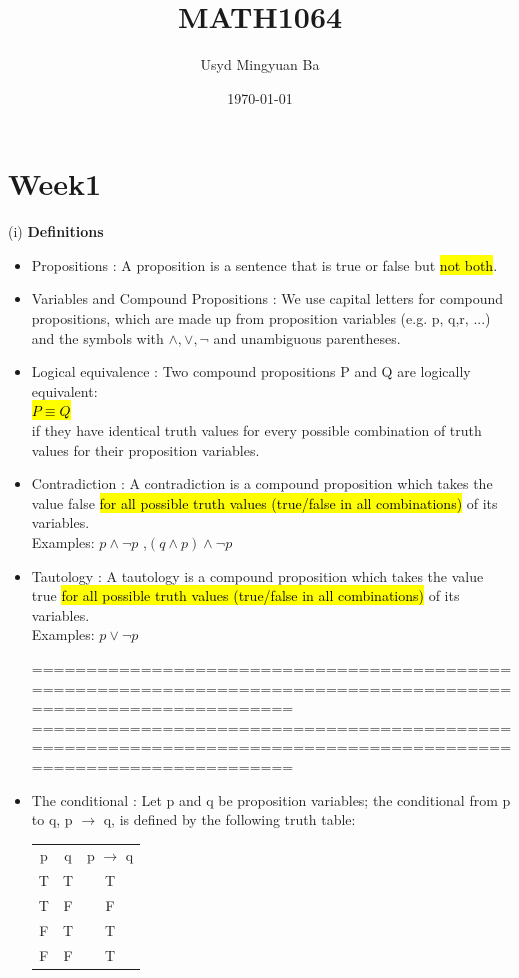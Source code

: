 \documentclass{article}
\title{MATH1064}
\author{Usyd Mingyuan Ba}
\date{\today}
\begin{document}
\maketitle

\section{Week1}
(i) \textbf{Definitions}
\begin{itemize}
\item Propositions : A proposition is a sentence that is true or false but \hl{not both}.

\item Variables and Compound Propositions : We use capital letters for compound propositions, which are made up from
proposition variables (e.g. p, q,r, ...) and the symbols with $\land , \lor , \neg$ and
unambiguous parentheses.

\item Logical equivalence : Two compound propositions P and Q are logically equivalent:\\
\hl{$P \equiv Q$}\\
if they have identical truth values for every possible combination of truth
values for their proposition variables.

\item Contradiction : A contradiction is a compound proposition which takes the value false \hl{for
all possible truth values (true/false in all combinations)} of its variables.\\
Examples: $p \land \neg p$ ,$(q \land p) \land \neg p$

\item Tautology : A tautology is a compound proposition which takes the value true \hl{for all
possible truth values (true/false in all combinations)} of its variables.\\
Examples: $p \lor \neg p$

================================================================================================================
\newpage
================================================================================================================


\item The conditional : Let p and q be proposition variables; the conditional from p to q, p $\rightarrow$ q,
is defined by the following truth table:

\begin{tabular}{ccc}
  p & q & p $\rightarrow$ q \\
  T & T & T \\
  T & F & F \\
  F & T & T \\
  F & F & T \\
\end{tabular}


\end{itemize}
\end{document}
